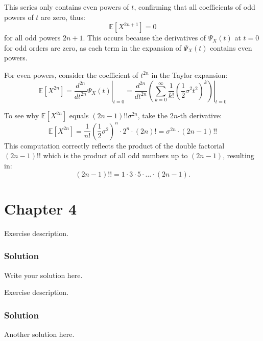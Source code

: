 \documentclass{article}
\begin{document}
\begin{enumerate}[label=(\alph*)]
    This series only contains even powers of \( t \), confirming that all coefficients of odd powers of \( t \) are zero, thus:
    \[
    \mathbb{E}[X^{2n+1}] = 0
    \]
    for all odd powers \( 2n+1 \). This occurs because the derivatives of \( \Psi_X(t) \) at \( t=0 \) for odd orders are zero, as each term in the expansion of \( \Psi_X(t) \) contains even powers.
    
    For even powers, consider the coefficient of \( t^{2n} \) in the Taylor expansion:
    \[
    \mathbb{E}[X^{2n}] = \left. \frac{d^{2n}}{dt^{2n}} \Psi_X(t) \right|_{t=0} = \left. \frac{d^{2n}}{dt^{2n}} \left( \sum_{k=0}^{\infty} \frac{1}{k!} \left(\frac{1}{2}\sigma^2 t^2\right)^k \right) \right|_{t=0}
    \]
    
    To see why \( \mathbb{E}[X^{2n}] \) equals \((2n-1)!! \sigma^{2n}\), take the \(2n\)-th derivative:
    \[
    \mathbb{E}[X^{2n}] = \frac{1}{n!} \left(\frac{1}{2} \sigma^2\right)^n \cdot 2^n \cdot (2n)! = \sigma^{2n} \cdot (2n-1)!!
    \]
    This computation correctly reflects the product of the double factorial \((2n-1)!!\) which is the product of all odd numbers up to \((2n-1)\), resulting in:
    \[
    (2n-1)!! = 1 \cdot 3 \cdot 5 \cdot \ldots \cdot (2n-1).
    \]
    
\end{enumerate}


\section{Chapter 4}

\exercise
Exercise description.
\subsubsection*{Solution}
Write your solution here.

\exercise
Exercise description.
\subsubsection*{Solution}
Another solution here.
\end{document}
